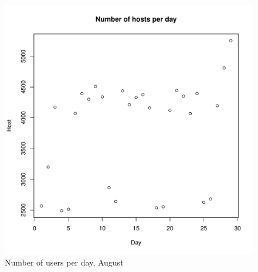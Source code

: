 \documentclass[english]{article}
\begin{document}
\begin{figure}[H]
\centerline{\includegraphics{Weblogs/Aug/NumberOfHostsPerDay.pdf}}
\caption{Number of users per day, August}
\end{figure}
\end{document}
